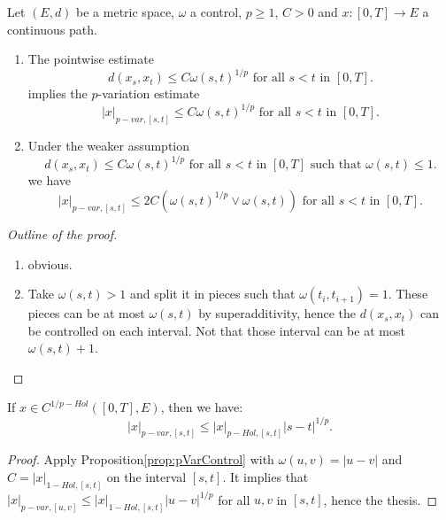 \begin{proposition}\label{prop:pVarControl}
    Let $(E,d)$ be a metric space, $\omega$ a control, $p \geq 1$, $C>0$ and $x:[0,T] \rightarrow E$ a continuous path.
    \begin{enumerate}
        \item The pointwise estimate 
        \begin{equation}
            d(x_s, x_t) \leq C \omega(s,t)^{1/p} \text{ for all } s < t \text{ in } [0,T].
        \end{equation}
        implies the $p$-variation estimate
        \begin{equation}
            |x|_{p-var, [s,t]} \leq C \omega(s,t)^{1/p} \text{ for all } s < t \text{ in } [0,T].
        \end{equation}
        \item Under the weaker assumption 
        \begin{equation}
            d(x_s, x_t) \leq C \omega(s, t)^{1/p} \text{ for all } s < t \text{ in } [0,T] \text{ such that } \omega(s,t) \leq 1.
        \end{equation}
        we have
        \begin{equation}
            |x|_{p-var, [s,t]} \leq 2 C \left( \omega(s,t)^{1/p} \vee \omega(s,t) \right) \text{ for all } s < t \text{ in } [0,T].
        \end{equation}
    \end{enumerate}

\end{proposition}
\begin{proof}[Outline of the proof]
    \begin{enumerate}
        \item obvious.
        \item Take $\omega(s,t) > 1$ and split it in pieces such that $\omega(t_i, t_{i+1})=1$. These pieces can be at most $\omega(s,t)$ by superadditivity, hence the $d(x_s,x_t)$ can be controlled on each interval. Not that those interval can be at most $\omega(s,t) + 1$.
    \end{enumerate}
\end{proof}

\begin{corollary}\label{lem:pHolderControl}
    If $x \in C^{1/p-Hol}([0,T], E)$, then we have:
    \begin{equation}
        |x|_{p-var, [s,t]} \leq |x|_{p-Hol,[s,t]} |s - t|^{1/p}.
    \end{equation}
\end{corollary}
\begin{proof}
    Apply Proposition\ref{prop:pVarControl} with $\omega(u,v) = |u - v|$ and $C = |x|_{1-Hol,[s,t]}$ on the interval $[s,t]$.
    It implies that $|x|_{p-var, [u,v]} \leq |x|_{1-Hol,[s,t]} |u - v|^{1/p}$ for all $u, v$ in $[s,t]$, hence the thesis.
\end{proof}

